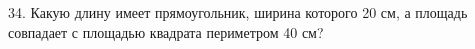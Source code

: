 34. Какую длину имеет прямоугольник, ширина которого 20 см, а площадь совпадает с площадью квадрата периметром 40 см?\\

